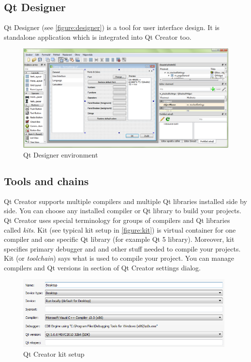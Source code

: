 \subsection{Qt Designer}
Qt Designer (see \autoref{figure:designer}) is a tool for user interface design. It is standalone application which is integrated into Qt Creator too.

\begin{figure}[ht]
\centering
\includegraphics[width=14.5cm]{graphics/laboratory/07-designer.png}
\caption{Qt Designer environment}\label{figure:designer}
\end{figure}

\subsection{Tools and chains}
Qt Creator supports multiple compilers and multiple Qt libraries installed side by side. You can choose any installed compiler or Qt library to build your projects. Qt Creator uses special terminology for groups of compilers and Qt libraries called \textit{kits}. Kit (see typical kit setup in \autoref{figure:kit}) is virtual container for one compiler and one specific Qt library (for example Qt 5 library). Moreover, kit specifies primary debugger and and other stuff needed to compile your projects. Kit (or \textit{toolchain}) says what is used to compile your project. You can manage compilers and Qt versions in section of Qt Creator settings dialog.

\begin{figure}[ht]
\centering
\includegraphics[width=11cm]{graphics/laboratory/08-qtcreator-kits.png}
\caption{Qt Creator kit setup}\label{figure:kit}
\end{figure}


